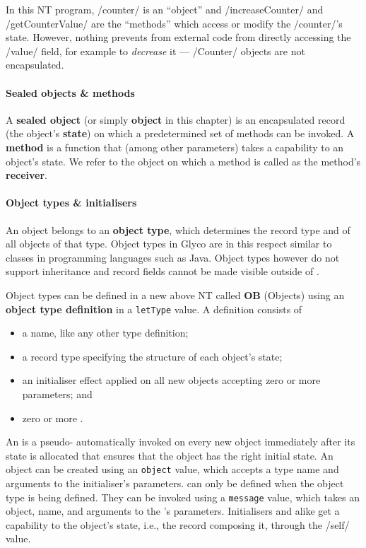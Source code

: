 \documentclass[main.tex]{subfiles}
\begin{document}
In this NT program, \iil/counter/ is an \enquote{object} and \iil/increaseCounter/ and \iil/getCounterValue/ are the \enquote{methods} which access or modify the \iil/counter/'s state. However, nothing prevents from external code from directly accessing the \iil/value/ field, for example to \emph{decrease} it — \iil/Counter/ objects are not encapsulated.

\paragraph{Sealed objects \& methods} A \textbf{sealed object} (or simply \textbf{object} in this chapter) is an encapsulated record (the object's \textbf{state}) on which a predetermined set of methods can be invoked. A \textbf{method} is a function that (among other parameters) takes a capability to an object's state. We refer to the object on which a method is called as the method's \textbf{receiver}.

\paragraph{Object types \& initialisers} An object belongs to an \textbf{object type}, which determines the record type and  of all objects of that type. Object types in Glyco are in this respect similar to classes in programming languages such as Java. Object types however do not support inheritance and record fields cannot be made visible outside of .

Object types can be defined in a new  above NT called \textbf{OB} (Objects) using an \textbf{object type definition} in a \texttt{letType} value. A definition consists of
\begin{itemize}[nosep]
	\item a name, like any other type definition;
	\item a record type specifying the structure of each object's state;
	\item an initialiser effect applied on all new objects accepting zero or more parameters; and
	\item zero or more .
\end{itemize}

An \textbf{} is a pseudo- automatically invoked on every new object immediately after its state is allocated that ensures that the object has the right initial state. An object can be created using an \texttt{object} value, which accepts a type name and arguments to the initialiser's parameters.  can only be defined when the object type is being defined. They can be invoked using a \texttt{message} value, which takes an object,  name, and arguments to the 's parameters. Initialisers and  alike get a capability to the object's state, i.e., the record composing it, through the \iil/self/ value.
\end{document}
